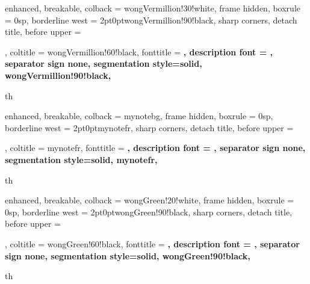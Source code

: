 


{%
	enhanced,
	breakable,
	colback = wongVermillion!30!white,
	frame hidden,
	boxrule = 0sp,
	borderline west = {2pt}{0pt}{wongVermillion!90!black},
	sharp corners,
	detach title,
	before upper = \tcbtitle\par\smallskip,
	coltitle = wongVermillion!60!black,
	fonttitle = \bfseries\sffamily,
	description font = \mdseries,
	separator sign none,
	segmentation style={solid, wongVermillion!90!black},
}
{th}


{%
	enhanced,
	breakable,
	colback = mynotebg,
	frame hidden,
	boxrule = 0sp,
	borderline west = {2pt}{0pt}{mynotefr},
	sharp corners,
	detach title,
	before upper = \tcbtitle\par\smallskip,
	coltitle = mynotefr,
	fonttitle = \bfseries\sffamily,
	description font = \mdseries,
	separator sign none,
	segmentation style={solid, mynotefr},
}
{th}


{%
	enhanced,
	breakable,
	colback = wongGreen!20!white,
	frame hidden,
	boxrule = 0sp,
	borderline west = {2pt}{0pt}{wongGreen!90!black},
	sharp corners,
	detach title,
	before upper = \tcbtitle\par\smallskip,
	coltitle = wongGreen!60!black,
	fonttitle = \bfseries\sffamily,
	description font = \mdseries,
	separator sign none,
	segmentation style={solid, wongGreen!90!black},
}
{th}


